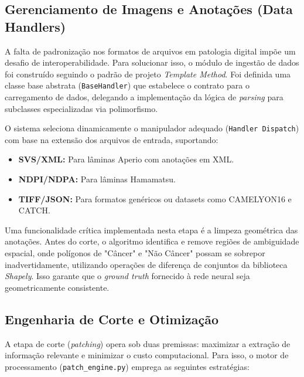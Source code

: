 \subsection{Gerenciamento de Imagens e Anotações (Data Handlers)}

A falta de padronização nos formatos de arquivos em patologia digital impõe um desafio de interoperabilidade. Para solucionar isso, o módulo de ingestão de dados foi construído seguindo o padrão de projeto \textit{Template Method}. Foi definida uma classe base abstrata (\texttt{BaseHandler}) que estabelece o contrato para o carregamento de dados, delegando a implementação da lógica de \textit{parsing} para subclasses especializadas via polimorfismo.

O sistema seleciona dinamicamente o manipulador adequado (\texttt{Handler Dispatch}) com base na extensão dos arquivos de entrada, suportando:
\begin{itemize}
    \item \textbf{SVS/XML:} Para lâminas Aperio com anotações em XML.
    \item \textbf{NDPI/NDPA:} Para lâminas Hamamatsu.
    \item \textbf{TIFF/JSON:} Para formatos genéricos ou datasets como CAMELYON16 e CATCH.
\end{itemize}

Uma funcionalidade crítica implementada nesta etapa é a limpeza geométrica das anotações. Antes do corte, o algoritmo identifica e remove regiões de ambiguidade espacial, onde polígonos de "Câncer" e "Não Câncer" possam se sobrepor inadvertidamente, utilizando operações de diferença de conjuntos da biblioteca \textit{Shapely}. Isso garante que o \textit{ground truth} fornecido à rede neural seja geometricamente consistente.

\subsection{Engenharia de Corte e Otimização}

A etapa de corte (\textit{patching}) opera sob duas premissas: maximizar a extração de informação relevante e minimizar o custo computacional. Para isso, o motor de processamento (\texttt{patch\_engine.py}) emprega as seguintes estratégias:

